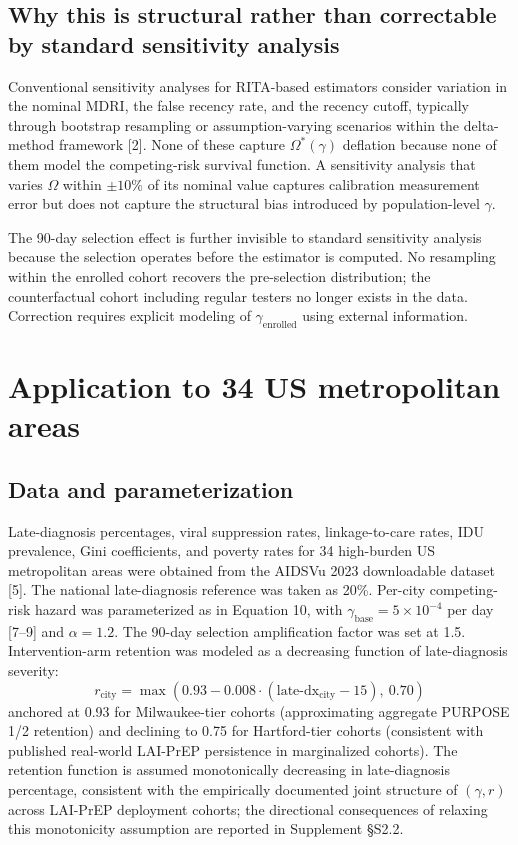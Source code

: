 \documentclass[12pt]{article}
\begin{document}
\subsection{Why this is structural rather than correctable by standard sensitivity analysis}

Conventional sensitivity analyses for RITA-based estimators consider variation in the nominal MDRI, the false recency rate, and the recency cutoff, typically through bootstrap resampling or assumption-varying scenarios within the delta-method framework [2]. None of these capture $\Omega^*(\gamma)$ deflation because none of them model the competing-risk survival function. A sensitivity analysis that varies $\Omega$ within $\pm 10\%$ of its nominal value captures calibration measurement error but does not capture the structural bias introduced by population-level $\gamma$.

The 90-day selection effect is further invisible to standard sensitivity analysis because the selection operates before the estimator is computed. No resampling within the enrolled cohort recovers the pre-selection distribution; the counterfactual cohort including regular testers no longer exists in the data. Correction requires explicit modeling of $\gamma_{\mathrm{enrolled}}$ using external information.

\section{Application to 34 US metropolitan areas}

\subsection{Data and parameterization}

Late-diagnosis percentages, viral suppression rates, linkage-to-care rates, IDU prevalence, Gini coefficients, and poverty rates for 34 high-burden US metropolitan areas were obtained from the AIDSVu 2023 downloadable dataset [5]. The national late-diagnosis reference was taken as 20\%. Per-city competing-risk hazard was parameterized as in Equation 10, with $\gamma_{\mathrm{base}} = 5 \times 10^{-4}$ per day [7--9] and $\alpha = 1.2$. The 90-day selection amplification factor was set at 1.5. Intervention-arm retention was modeled as a decreasing function of late-diagnosis severity:
\begin{equation}
r_{\mathrm{city}} = \max(0.93 - 0.008 \cdot (\text{late-dx}_{\mathrm{city}} - 15),\ 0.70)
\end{equation}
anchored at 0.93 for Milwaukee-tier cohorts (approximating aggregate PURPOSE 1/2 retention) and declining to 0.75 for Hartford-tier cohorts (consistent with published real-world LAI-PrEP persistence in marginalized cohorts). The retention function is assumed monotonically decreasing in late-diagnosis percentage, consistent with the empirically documented joint structure of $(\gamma, r)$ across LAI-PrEP deployment cohorts; the directional consequences of relaxing this monotonicity assumption are reported in Supplement \S S2.2.
\end{document}
